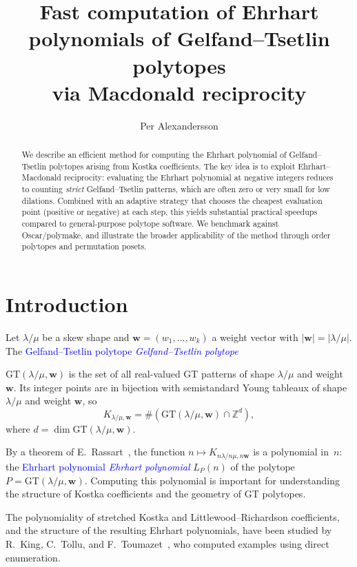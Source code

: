 \documentclass[11pt,reqno]{amsart}
\title[Ehrhart polynomials of GT polytopes via reciprocity]{Fast computation of Ehrhart polynomials of Gelfand--Tsetlin polytopes\\via Macdonald reciprocity}
\author{Per Alexandersson}
\date{}
\theoremstyle{definition}
\newcommand{\setZ}{\mathbb{Z}}
\newcommand{\GT}{\mathrm{GT}}
\newcommand{\lam}{\lambda}
\newcommand{\wt}{\mathbf{w}}
\newcommand{\Ehr}{L}
\newcommand{\defin}[1]{%
\relax\ifmmode%
\textcolor{blue}{#1}%
\else \textcolor{blue}{\emph{#1}}%
\fi%
}
\begin{document}
\begin{abstract}
We describe an efficient method for computing the Ehrhart polynomial of
Gelfand--Tsetlin polytopes arising from Kostka coefficients.
The key idea is to exploit Ehrhart--Macdonald reciprocity: evaluating
the Ehrhart polynomial at negative integers reduces to counting
\emph{strict} Gelfand--Tsetlin patterns, which are often zero or very
small for low dilations.  Combined with an adaptive strategy that chooses
the cheapest evaluation point (positive or negative) at each step, this
yields substantial practical speedups compared to general-purpose
polytope software.  We benchmark against Oscar/polymake,
and illustrate the broader applicability of the method through
order polytopes and permutation posets.
\end{abstract}

\maketitle

\section{Introduction}\label{sec:introduction}

Let $\lam/\mu$ be a skew shape and $\wt = (w_1, \dotsc, w_k)$ a weight
vector with $|\wt| = |\lam/\mu|$.  The \defin{Gelfand--Tsetlin polytope}
$\GT(\lam/\mu, \wt)$ is the set of all real-valued GT patterns of shape
$\lam/\mu$ and weight $\wt$.  Its integer points are in bijection with
semistandard Young tableaux of shape $\lam/\mu$ and weight $\wt$, so
\begin{equation}\label{eq:kostka}
  K_{\lam/\mu, \wt} = \#(\GT(\lam/\mu, \wt) \cap \setZ^d),
\end{equation}
where $d = \dim \GT(\lam/\mu, \wt)$.

By a theorem of E.~Rassart~\cite{Rassart2004}, the function
$n \mapsto K_{n\lam/n\mu, n\wt}$ is a polynomial in~$n$: the
\defin{Ehrhart polynomial} $\Ehr_P(n)$ of the polytope $P = \GT(\lam/\mu, \wt)$.
Computing this polynomial is important for understanding the structure of
Kostka coefficients and the geometry of GT polytopes.

The polynomiality of stretched Kostka and Littlewood--Richardson
coefficients, and the structure of the resulting Ehrhart polynomials,
have been studied by R.~King, C.~Tollu, and
F.~Toumazet~\cite{KingTolluToumazet2004}, who computed examples using
direct enumeration.
\end{document}
